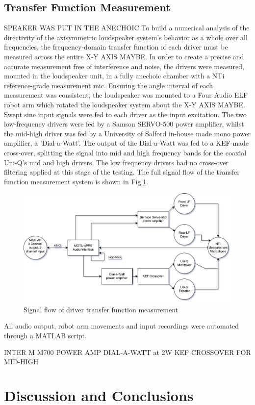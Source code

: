 \documentclass{report}
\begin{document}
    \section{Transfer Function Measurement}
        SPEAKER WAS PUT IN THE ANECHOIC
        To build a numerical analysis of the directivity of the axisymmetric loudspeaker system's behavior as a whole over all frequencies, the frequency-domain transfer function of each driver must be measured across the entire X-Y AXIS MAYBE.
        In order to create a precise and accurate measurement free of interference and noise, the drivers were measured, mounted in the loudspeaker unit, in a fully anechoic chamber with a NTi reference-grade measurement mic.
        Ensuring the angle interval of each measurement was consistent, the loudspeaker was mounted to a Four Audio ELF robot arm which rotated the loudspeaker system about the X-Y AXIS MAYBE.
        Swept sine input signals were fed to each driver as the input excitation.
        The two low-frequency drivers were fed by a Samson SERVO-500 power amplifier, whilst the mid-high driver was fed by a University of Salford in-house made mono power amplifier, a 'Dial-a-Watt'.
        The output of the Dial-a-Watt was fed to a KEF-made cross-over, splitting the signal into mid and high frequency bands for the coaxial Uni-Q's mid and high drivers.
        The low frequency drivers had no cross-over filtering applied at this stage of the testing.
        The full signal flow of the transfer function measurement system is shown in Fig.\ref{signalFlow}.
        \begin{figure}[H]
            \centering
            \includegraphics[scale=0.04]{figs/signalFlow.png}%
            \caption{Signal flow of driver transfer function measurement}
            \label{signalFlow}
        \end{figure}

        All audio output, robot arm movements and input recordings were automated through a MATLAB script.
        
        INTER M M700 POWER AMP
        DIAL-A-WATT at 2W
        KEF CROSSOVER FOR MID-HIGH
    

    

\chapter{Discussion and Conclusions}



\end{document}
